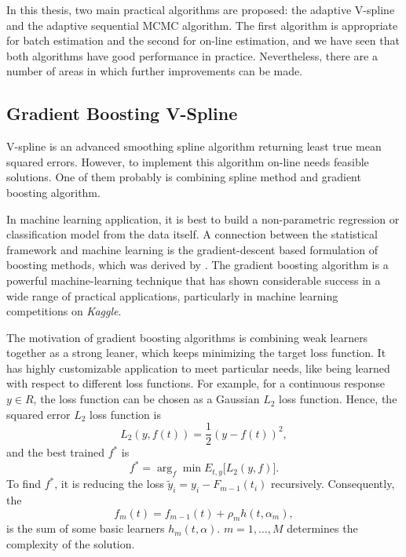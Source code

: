 
In this thesis, two main practical algorithms are proposed: the adaptive V-spline and the adaptive sequential MCMC algorithm. The first algorithm is appropriate for batch estimation and the second for on-line estimation, and we have seen that both algorithms have good performance in practice. Nevertheless, there are a number of areas in which further improvements can be made.


\subsection*{Gradient Boosting V-Spline}

V-spline is an advanced smoothing spline algorithm returning least true mean squared errors. However, to implement this algorithm on-line needs feasible solutions. One of them probably is combining spline method and gradient boosting algorithm. 


In machine learning application, it is best to build a non-parametric regression or classification model from the data itself. A connection between the statistical framework and machine learning is the gradient-descent based formulation of boosting methods, which was derived by \cite{freund1995desicion, friedman2001greedy}. The gradient boosting algorithm is a powerful machine-learning technique that has shown considerable success in a wide range of practical applications, particularly in machine learning competitions on \textit{Kaggle}. 


The motivation of gradient boosting algorithms is combining weak learners together as a strong leaner, which keeps minimizing the target loss function. 
It has highly customizable application to meet particular needs, like being learned with respect to different loss functions. For example, for a continuous response $y\in \mathit{R}$, the loss function can be chosen as a Gaussian $L_2$ loss function. Hence, the squared error $L_2$ loss function is 
\begin{equation}
L_2(y,f(t)) = \frac{1}{2}\left(y-f(t)\right)^2,
\end{equation}
and the best trained $f^*$ is 
\begin{equation}
f^* = \arg_{f}\min E_{t,y}\lbrack L_2\left(y,f\right)\rbrack.
\end{equation}
To find $f^*$, it is reducing the loss $\tilde{y}_i=y_i-F_{m-1}(t_i)$ recursively. Consequently, the 
\begin{equation}
f_m(t) = f_{m-1}(t)+ \rho_mh(t,\alpha_m),
\end{equation}
is the sum of some basic learners $h_m(t,\alpha)$. $m=1,\ldots,M$ determines the complexity of the solution. 


